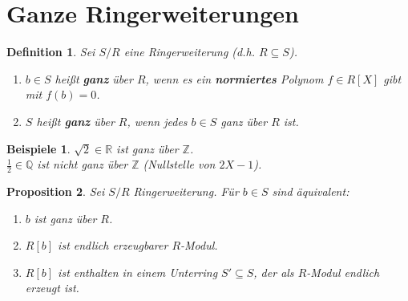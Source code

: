 \documentclass[a4paper,12pt]{scrbook}
\theoremstyle{break}
\newtheorem{Def}{Definition}[chapter]
\newtheorem{Prop}[Def]{Proposition}
\theoremstyle{nonumberbreak}
\newtheorem{nnBsp}{Beispiele}
\theoremstyle{nonumberplain}
\newcommand{\emp}[1]{\textbf{\emph{#1}}}
\begin{document}
\section{Ganze Ringerweiterungen}

\begin{Def} 
  Sei $S/R$ eine Ringerweiterung (d.h. $R \subseteq S$).
  \begin{enumerate} 
    \item $b \in S$ heißt \emp{ganz} über $R$, wenn es ein \emp{normiertes}
          Polynom $f \in R[X]$ gibt mit $f(b) = 0$.
    \item $S$ heißt \emp{ganz} über $R$, wenn jedes
    $b \in S$ ganz über $R$ ist.
\end{enumerate}
\end{Def}

\begin{nnBsp} 
  $\sqrt{2} \in \mathbb{R}$ ist ganz über $\mathbb{Z}$.\\
  $\frac{1}{2} \in \mathbb{Q}$ ist nicht ganz über $\mathbb{Z}$ (Nullstelle von
  $2X -1$).
\end{nnBsp}

\begin{Prop}
\label{2.7}
  Sei $S/R$ Ringerweiterung. Für $b \in S$ sind äquivalent:
  \begin{enumerate} 
  \item[(i)] $b$ ist ganz über $R$.
  \item[(ii)] $R[b]$ ist endlich erzeugbarer $R$-Modul.
  \item[(iii)] $R[b]$ ist enthalten in einem Unterring $S' \subseteq S$, der
    als $R$-Modul endlich erzeugt ist.
\end{enumerate}
\end{Prop}
\end{document}
